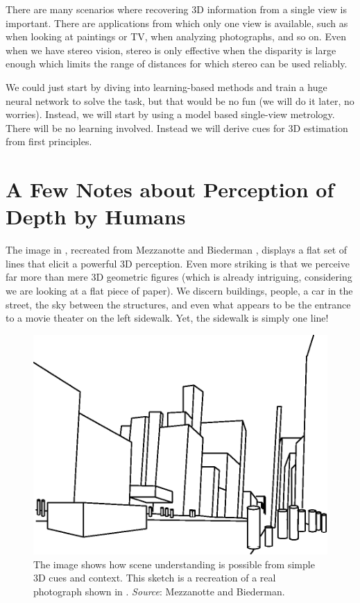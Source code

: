 



There are many scenarios where recovering 3D information from a single view is important. There are applications from which only one view is available, such as when looking at paintings or TV, when analyzing photographs, and so on. Even when we have stereo vision, stereo is only effective when the disparity is large enough which limits the range of distances for which stereo can be used reliably.

We could just start by diving into learning-based methods and train a huge neural network to solve the task, but that would be no fun (we will do it later, no worries). Instead, we will start by using a model based single-view metrology. There will be no learning involved. Instead we will derive cues for 3D estimation from first principles.  


\section{A Few Notes about Perception of Depth by Humans}

The image in \fig{\ref{fig:streetgeons}}, recreated from Mezzanotte and Biederman \cite{Biederman1976}, displays a flat set of lines that elicit a powerful 3D perception. Even more striking is that we perceive far more than mere 3D geometric figures (which is already intriguing, considering we are looking at a flat piece of paper). We discern buildings, people, a car in the street, the sky between the structures, and even what appears to be the entrance to a movie theater on the left sidewalk. Yet, the sidewalk is simply one line!

\begin{figure}[!h]
\centerline{
\includegraphics[width=.8\linewidth]{figures/single_view_3d/streetgeons.eps}
}
\caption{The image shows how scene understanding is possible from simple 3D cues and context. This sketch is a recreation of a real photograph shown in \cite{Biederman1976}. {\em Source}: 
Mezzanotte and Biederman.
}
\label{fig:streetgeons}
\end{figure}

